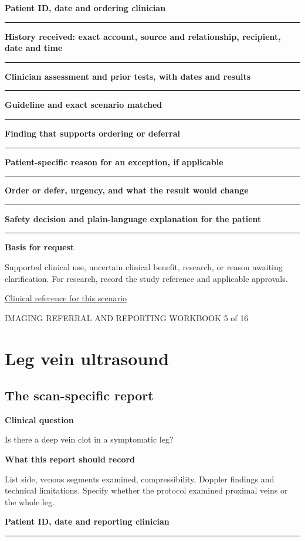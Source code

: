 \documentclass[11pt,a4paper]{article}
\newcommand{\record}[1]{\textbf{#1}\par\vspace{0.55\baselineskip}\hrule\vspace{0.35\baselineskip}}
\begin{document}
\record{Patient ID, date and ordering clinician}

\record{History received: exact account, source and relationship, recipient, date and time}

\record{Clinician assessment and prior tests, with dates and results}

\record{Guideline and exact scenario matched}

\record{Finding that supports ordering or deferral}

\record{Patient-specific reason for an exception, if applicable}

\record{Order or defer, urgency, and what the result would change}

\record{Safety decision and plain-language explanation for the patient}

\textbf{Basis for request}\par Supported clinical use, uncertain clinical benefit, research, or reason awaiting clarification. For research, record the study reference and applicable approvals.\par

\small\href{https://www.nice.org.uk/guidance/ng158/chapter/Recommendations}{Clinical reference for this scenario}

\normalsize

\newpage

{\small IMAGING REFERRAL AND REPORTING WORKBOOK \hfill 5 of 16}

\section*{Leg vein ultrasound}

\subsection*{The scan-specific report}

\textbf{Clinical question}\par Is there a deep vein clot in a symptomatic leg?\par

\textbf{What this report should record}\par List side, venous segments examined, compressibility, Doppler findings and technical limitations. Specify whether the protocol examined proximal veins or the whole leg.\par

\record{Patient ID, date and reporting clinician}
\end{document}
